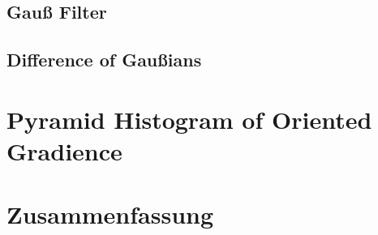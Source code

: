 \subsection{Gauß Filter}

\blindtext

\subsection{Difference of Gaußians}

\blindtext

\section{Pyramid Histogram of Oriented Gradience}

\blindtext

\section{Zusammenfassung}

\blindtext
